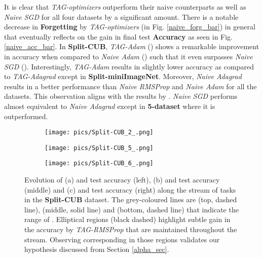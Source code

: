 \documentclass{article} \usepackage{collas2022_conference,times}
\begin{document}
    It is clear that \textit{TAG-optimizers} outperform their naive counterparts as well as \textit{Naive SGD} for all four datasets by a significant amount. There is a notable decrease in \textbf{Forgetting} by \textit{TAG-optimizers} (in Fig. \ref{naive_forg_bar}) in general that eventually reflects on the gain in final test \textbf{Accuracy} as seen in Fig. \ref{naive_acc_bar}. In \textbf{Split-CUB}, \textit{TAG-Adam} () shows a remarkable improvement in accuracy when compared to \textit{Naive Adam} () such that it even surpasses \textit{Naive SGD} (). Interestingly, \textit{TAG-Adam} results in slightly lower accuracy as compared to \textit{TAG-Adagrad} except in \textbf{Split-miniImageNet}. Moreover, \textit{Naive Adagrad} results in a better performance than \textit{Naive RMSProp} and \textit{Naive Adam} for all the datasets. This observation aligns with the results by \citet{hsu2018re}. \textit{Naive SGD} performs almost equivalent to \textit{Naive Adagrad} except in \textbf{5-dataset} where it is outperformed.
    





\begin{figure*}[h!]
        \centering
        \begin{subfigure}[b]{0.28\textwidth}
            \texttt{[image: pics/Split-CUB\_2\_.png]}
            \caption{}\label{t2}
        \end{subfigure}
        \hfill
        \begin{subfigure}[b]{0.28\textwidth}
            \texttt{[image: pics/Split-CUB\_5\_.png]}
            \caption{}\label{t5}
        \end{subfigure}
        \hfill
        \begin{subfigure}[b]{0.28\textwidth}
            \texttt{[image: pics/Split-CUB\_6\_.png]}
            \caption{}\label{t6}
        \end{subfigure}
\caption{Evolution of (a)  and test accuracy  (left), (b)  and test accuracy  (middle) and (c)  and test accuracy  (right) along the stream of  tasks in the \textbf{Split-CUB} dataset. The grey-coloured lines are  (top, dashed line),  (middle, solid line) and  (bottom, dashed line) that indicate the range of . Elliptical regions (black dashed) highlight subtle gain in the accuracy by \textit{TAG-RMSProp} that are maintained throughout the stream. Observing corresponding  in those regions validates our hypothesis discussed from Section \ref{alpha_sec}.}
        \label{alpha_fig}
    \end{figure*}
\end{document}
